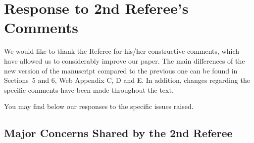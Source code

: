     \section*{Response to 2nd Referee's Comments}
    We would like to thank the Referee for his/her constructive comments, which have allowed us to considerably improve our paper. The main differences of the new version of the manuscript compared to the previous one can be found in Sections~5 and 6, Web Appendix C, D and E. In addition, changes regarding the specific comments have been made throughout the text.

    You may find below our responses to the specific issues raised.

    \subsection*{Major Concerns Shared by the 2nd Referee}
